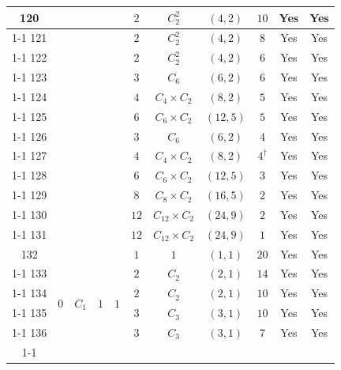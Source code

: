\documentclass[12pt]{amsart}
\numberwithin{equation}{section}
\theoremstyle{plain}
\theoremstyle{definition}
\theoremstyle{remark}
\begin{document}
{\begin{longtable}{|c|c|c|c|c|c|c|c|c|c|c|}
120 &  &  &  &  & $2$ & \multicolumn{1}{c|}{$C_2^2$} & $(4,2)$ & $10$ & Yes & Yes \\ \cline{1-1} \cline{6-11}
121 &  &  &  &  & $2$ & \multicolumn{1}{c|}{$C_2^2$} & $(4,2)$ & $8$ & Yes & Yes \\ \cline{1-1} \cline{6-11}
122 &  &  &  &  & $2$ & \multicolumn{1}{c|}{$C_2^2$} & $(4,2)$ & $6$ & Yes & Yes \\ \cline{1-1} \cline{6-11}
123 &  &  &  &  & $3$ & \multicolumn{1}{c|}{$C_{6}$} & $(6,2)$ & $6$ & Yes & Yes \\ \cline{1-1} \cline{6-11}
124 &  &  &  &  & $4$ & \multicolumn{1}{c|}{$C_{4} \times C_{2}$} & $(8,2)$ & $5$ & Yes & Yes \\ \cline{1-1} \cline{6-11}
125 &  &  &  &  & $6$ & \multicolumn{1}{c|}{$C_{6} \times C_{2}$} & $(12,5)$ & $5$ & Yes & Yes \\ \cline{1-1} \cline{6-11}
126 &  &  &  &  & $3$ & \multicolumn{1}{c|}{$C_{6}$} & $(6,2)$ & $4$ & Yes & Yes \\ \cline{1-1} \cline{6-11}
127 &  &  &  &  & $4$ & \multicolumn{1}{c|}{$C_{4} \times C_{2}$} & $(8,2)$ & $4^\dagger$ & Yes & Yes \\ \cline{1-1} \cline{6-11}
128 &  &  &  &  & $6$ & \multicolumn{1}{c|}{$C_{6} \times C_{2}$} & $(12,5)$ & $3$ & Yes & Yes \\ \cline{1-1} \cline{6-11}
129 &  &  &  &  & $8$ & \multicolumn{1}{c|}{$C_{8} \times C_{2}$} & $(16,5)$ & $2$ & Yes & Yes \\ \cline{1-1} \cline{6-11}
130 &  &  &  &  & $12$ & \multicolumn{1}{c|}{$C_{12} \times C_{2}$} & $(24,9)$ & $2$ & Yes & Yes \\ \cline{1-1} \cline{6-11}
131 &  &  &  &  & $12$ & \multicolumn{1}{c|}{$C_{12} \times C_{2}$} & $(24,9)$ & $1$ & Yes & Yes \\ \hline
132 & \multirow[t]{25}{*}{$0$} & \multirow[t]{25}{*}{$C_1$} & \multirow[t]{25}{*}{$1$} & \multirow[t]{25}{*}{$1$} & $1$ & \multicolumn{1}{c|}{$1$} & $(1,1)$ & $20$ & Yes & Yes \\ \cline{1-1} \cline{6-11}
133 &  &  &  &  & $2$ & \multicolumn{1}{c|}{$C_{2}$} & $(2,1)$ & $14$ & Yes & Yes \\ \cline{1-1} \cline{6-11}
134 &  &  &  &  & $2$ & \multicolumn{1}{c|}{$C_{2}$} & $(2,1)$ & $10$ & Yes & Yes \\ \cline{1-1} \cline{6-11}
135 &  &  &  &  & $3$ & \multicolumn{1}{c|}{$C_{3}$} & $(3,1)$ & $10$ & Yes & Yes \\ \cline{1-1} \cline{6-11}
136 &  &  &  &  & $3$ & \multicolumn{1}{c|}{$C_{3}$} & $(3,1)$ & $7$ & Yes & Yes \\ \cline{1-1} \cline{6-11}

\end{longtable}}
\end{document}
